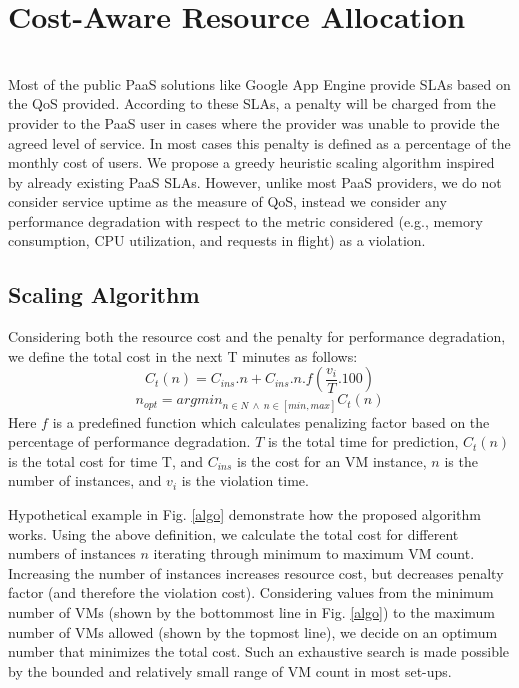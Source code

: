 \section{Cost-Aware Resource Allocation}\\
Most of the public PaaS solutions like Google App Engine provide SLAs based on the QoS provided. According to these SLAs, a penalty will be charged from the provider to the PaaS user in cases where the provider was unable to provide the agreed level of service. In most cases this penalty is defined as a percentage of the monthly cost of users. We propose a greedy heuristic scaling algorithm inspired by already existing PaaS SLAs. However, unlike most PaaS providers, we do not consider service uptime as the measure of QoS, instead we consider any performance degradation with respect to the metric considered (e.g., memory consumption, CPU utilization, and requests in flight) as a violation.

\subsection{Scaling Algorithm}
Considering both the resource cost and the penalty for performance degradation, we define the total cost in the next T minutes as follows:
\begin{equation}
C_t(n) = C_{ins}.n + C_{ins} . n . f(\frac{v_i}{T}.100)
\end{equation}
\begin{equation}
n_{opt} = argmin_{n \in N \ \land \ n \in [min, max]}C_t(n)
\end{equation}
Here $f$ is a predefined function which calculates penalizing factor based on the percentage of performance degradation. $T$ is the total time for prediction, $C_t(n)$ is the total cost for time T, and $C_{ins}$ is the cost for an VM instance, $n$ is the number of instances, and $v_i$ is the violation time. 

Hypothetical example in Fig. \ref{algo} demonstrate how the proposed algorithm works. Using the above definition, we calculate the total cost for different numbers of instances $n$ iterating through minimum to maximum VM count. Increasing the number of instances increases resource cost, but decreases penalty factor (and therefore the violation cost). Considering values from the minimum number of VMs (shown by the bottommost line in Fig. \ref{algo}) to the maximum number of VMs allowed (shown by the topmost line), we decide on an optimum number that minimizes the total cost. Such an exhaustive search is made possible by the bounded and relatively small range of VM count in most set-ups.